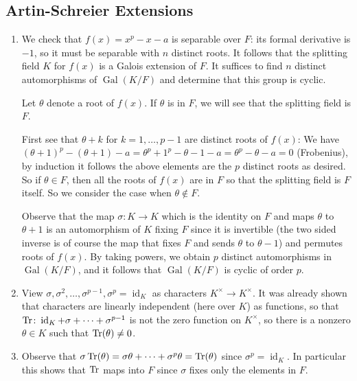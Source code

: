 \documentclass[11pt]{article}
\DeclareMathOperator{\Gal}{Gal}
\DeclareMathOperator{\id}{id}
\begin{document}
\subsection*{Artin-Schreier Extensions} \begin{enumerate}[label=(\alph*)]
    \item We check that $f(x) = x^p-x-a$ is separable over $F$: its formal derivative is $-1$, so it must be separable with $n$ distinct roots. It follows that the splitting field $K$ for $f(x)$ is a Galois extension of $F$. It suffices to find $n$ distinct automorphisms of $\Gal(K/F)$ and determine that this group is cyclic.
    
    Let $\theta$ denote a root of $f(x)$. If $\theta$ is in $F$, we will see that the splitting field is $F$. 
    
    First see that $\theta+k$ for $k= 1,\dots,p-1$ are distinct roots of $f(x)$: We have $(\theta+1)^p-(\theta+1)-a = \theta^p+1^p-\theta-1-a = \theta^p-\theta-a = 0$ (Frobenius), by induction it follows the above elements are the $p$ distinct roots as desired. So if $\theta\in F$, then all the roots of $f(x)$ are in $F$ so that the splitting field is $F$ itself. So we consider the case when $\theta\not\in F$.
    
    Observe that the map $\sigma\colon K\to K$ which is the identity on $F$ and maps $\theta$ to $\theta+1$ is an automorphism of $K$ fixing $F$ since it is invertible (the two sided inverse is of course the map that fixes $F$ and sends $\theta$ to $\theta-1$) and permutes roots of $f(x)$. By taking powers, we obtain $p$ distinct automorphisms in $\Gal(K/F)$, and it follows that $\Gal(K/F)$ is cyclic of order $p$.
    \item View $\sigma,\sigma^2,\dots,\sigma^{p-1},\sigma^p = \id_K$ as characters $K^\times\to K^\times$. It was already shown that characters are linearly independent (here over $K$) as functions, so that $\Tr \colon \id_K + \sigma + \cdots + \sigma^{p-1}$ is not the zero function on $K^\times$, so there is a nonzero $\theta\in K$ such that $\Tr(\theta)\neq 0$.
    \item Observe that $\sigma\Tr(\theta) = \sigma\theta + \cdots + \sigma^p\theta = \Tr(\theta)$ since $\sigma^p = \id_K$. In particular this shows that $\Tr$ maps into $F$ since $\sigma$ fixes only the elements in $F$.
    

\end{enumerate}
\end{document}
